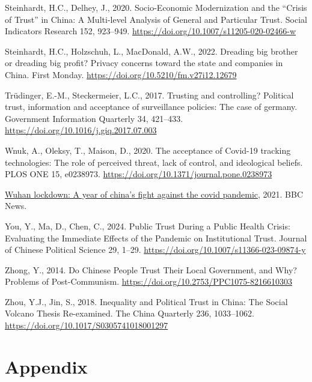 \documentclass[
  letterpaper,
  DIV=11,
  numbers=noendperiod]{scrartcl}
\newlength{\cslhangindent}
\newenvironment{CSLReferences}[2] %
 {\begin{list}{}{%
  \setlength{\itemindent}{0pt}
  \setlength{\leftmargin}{0pt}
  \setlength{\parsep}{0pt}
  \ifodd #1
   \setlength{\leftmargin}{\cslhangindent}
   \setlength{\itemindent}{-1\cslhangindent}
  \fi
  \setlength{\itemsep}{#2\baselineskip}}}
 {\end{list}}
\begin{document}
\begin{CSLReferences}{1}{0}
Steinhardt, H.C., Delhey, J., 2020. Socio-Economic Modernization and the
{``}Crisis of Trust{''} in China: A Multi-level Analysis of General and
Particular Trust. Social Indicators Research 152, 923--949.
\url{https://doi.org/10.1007/s11205-020-02466-w}

Steinhardt, H.C., Holzschuh, L., MacDonald, A.W., 2022. Dreading big
brother or dreading big profit? Privacy concerns toward the state and
companies in China. First Monday.
\url{https://doi.org/10.5210/fm.v27i12.12679}

Trüdinger, E.-M., Steckermeier, L.C., 2017. Trusting and controlling?
Political trust, information and acceptance of surveillance policies:
The case of germany. Government Information Quarterly 34, 421--433.
\url{https://doi.org/10.1016/j.giq.2017.07.003}

Wnuk, A., Oleksy, T., Maison, D., 2020. The acceptance of Covid-19
tracking technologies: The role of perceived threat, lack of control,
and ideological beliefs. PLOS ONE 15, e0238973.
\url{https://doi.org/10.1371/journal.pone.0238973}

\href{https://www.bbc.com/news/world-asia-china-55628488}{Wuhan
lockdown: A year of china's fight against the covid pandemic}, 2021. BBC
News.

You, Y., Ma, D., Chen, C., 2024. Public Trust During a Public Health
Crisis: Evaluating the Immediate Effects of the Pandemic on
Institutional Trust. Journal of Chinese Political Science 29, 1--29.
\url{https://doi.org/10.1007/s11366-023-09874-y}

Zhong, Y., 2014. Do Chinese People Trust Their Local Government, and
Why? Problems of Post-Communism.
\url{https://doi.org/10.2753/PPC1075-8216610303}

Zhou, Y.J., Jin, S., 2018. Inequality and Political Trust in China: The
Social Volcano Thesis Re-examined. The China Quarterly 236, 1033--1062.
\url{https://doi.org/10.1017/S0305741018001297}

\end{CSLReferences}

\newpage{}

\section{Appendix}\label{sec-appendix}
\end{document}

